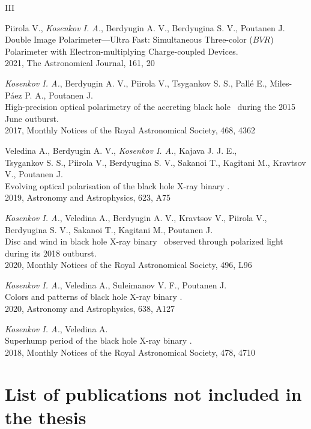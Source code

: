\begin{entry}{III} %
    \item[I] Piirola V., \textit{Kosenkov I. A.}, Berdyugin A. V., Berdyugina S. V., Poutanen J. \\ Double Image Polarimeter—Ultra Fast: Simultaneous Three-color ($BVR$) Polarimeter with Electron-multiplying Charge-coupled Devices.\\ 2021, The Astronomical Journal, 161, 20
    \item[II] \textit{Kosenkov I. A.}, Berdyugin A. V., Piirola V., Tsygankov S. S., Pall\'e E., Miles-P\'aez P. A., Poutanen J.\\ High-precision optical polarimetry of the accreting black hole \VCYG\ during the 2015 June outburst.\\ 2017, Monthly Notices of the Royal Astronomical Society, 468, 4362
    \item[III] Veledina A., Berdyugin A. V., \textit{Kosenkov I. A.}, Kajava J. J. E.,\\ Tsygankov S. S., Piirola V., Berdyugina S. V., Sakanoi T., Kagitani M., Kravtsov V., Poutanen J.\\ Evolving optical polarisation of the black hole X-ray binary \MAXI.\\ 2019, Astronomy and Astrophysics, 623, A75
    \item[IV] \textit{Kosenkov I. A.}, Veledina A., Berdyugin A. V., Kravtsov V., Piirola V., Berdyugina S. V., Sakanoi T., Kagitani M., Poutanen J.\\ Disc and wind in black hole X-ray binary \MAXI\ observed through polarized light during its 2018 outburst.\\ 2020, Monthly Notices of the Royal Astronomical Society, 496, L96
    \item[V] \textit{Kosenkov I. A.}, Veledina A., Suleimanov V. F., Poutanen J.\\ Colors and patterns of black hole X-ray binary \GX.\\ 2020, Astronomy and Astrophysics, 638, A127
    \item[VI] \textit{Kosenkov I. A.}, Veledina A.\\ Superhump period of the black hole X-ray binary \GX.\\ 2018, Monthly Notices of the Royal Astronomical Society, 478, 4710
\end{entry}
\clearpage

\iffin
\section*{List of publications not included in the thesis}
\else
